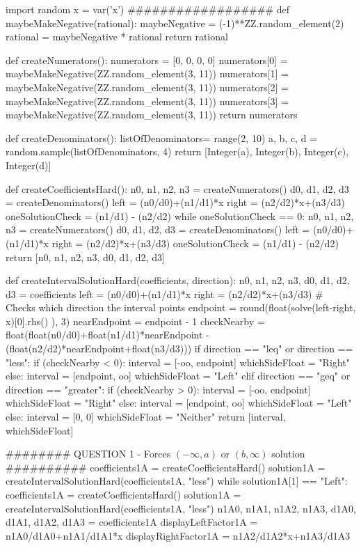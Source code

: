 \documentclass{ximera}
\begin{document}
\begin{sagesilent}
import random
x = var('x')
##################
def maybeMakeNegative(rational):
    maybeNegative = (-1)**ZZ.random_element(2)
    rational = maybeNegative * rational
    return rational
    
def createNumerators():
    numerators = [0, 0, 0, 0]
    numerators[0] = maybeMakeNegative(ZZ.random_element(3, 11))
    numerators[1] = maybeMakeNegative(ZZ.random_element(3, 11))
    numerators[2] = maybeMakeNegative(ZZ.random_element(3, 11))
    numerators[3] = maybeMakeNegative(ZZ.random_element(3, 11))
    return numerators

def createDenominators():
    listOfDenominators= range(2, 10)
    a, b, c, d = random.sample(listOfDenominators, 4)
    return [Integer(a), Integer(b), Integer(c), Integer(d)]

def createCoefficientsHard():
    n0, n1, n2, n3 = createNumerators()
    d0, d1, d2, d3 = createDenominators()
    left = (n0/d0)+(n1/d1)*x
    right = (n2/d2)*x+(n3/d3)
    oneSolutionCheck = (n1/d1) - (n2/d2)
    while oneSolutionCheck == 0:
        n0, n1, n2, n3 = createNumerators()
        d0, d1, d2, d3 = createDenominators()
        left = (n0/d0)+(n1/d1)*x
        right = (n2/d2)*x+(n3/d3)
        oneSolutionCheck = (n1/d1) - (n2/d2)
    return [n0, n1, n2, n3, d0, d1, d2, d3]

def createIntervalSolutionHard(coefficients, direction):
    n0, n1, n2, n3, d0, d1, d2, d3 = coefficients
    left = (n0/d0)+(n1/d1)*x
    right = (n2/d2)*x+(n3/d3)
    # Checks which direction the interval points
    endpoint = round(float(solve(left-right, x)[0].rhs() ), 3)
    nearEndpoint = endpoint - 1
    checkNearby = float(float(n0/d0)+float(n1/d1)*nearEndpoint - (float(n2/d2)*nearEndpoint+float(n3/d3)))
    if direction == "leq" or direction == "less":
        if (checkNearby < 0):
            interval = [-oo, endpoint]
            whichSideFloat = "Right"
        else:
            interval = [endpoint, oo]
            whichSideFloat = "Left"  
    elif direction == "geq" or direction == "greater": 
        if (checkNearby > 0):
            interval = [-oo, endpoint]
            whichSideFloat = "Right"
        else:
            interval = [endpoint, oo]
            whichSideFloat = "Left"
    else:
        interval = [0, 0]
        whichSideFloat = "Neither"
    return [interval, whichSideFloat]

######## QUESTION 1 - Forces $(-\infty, a) \text{ or } (b, \infty)$ solution ##########
coefficients1A = createCoefficientsHard()
solution1A = createIntervalSolutionHard(coefficients1A, "less")
while solution1A[1] == "Left":
    coefficients1A = createCoefficientsHard()
    solution1A = createIntervalSolutionHard(coefficients1A, "less")
n1A0, n1A1, n1A2, n1A3, d1A0, d1A1, d1A2, d1A3 = coefficients1A
displayLeftFactor1A = n1A0/d1A0+n1A1/d1A1*x
displayRightFactor1A = n1A2/d1A2*x+n1A3/d1A3


\end{sagesilent}
\end{document}

